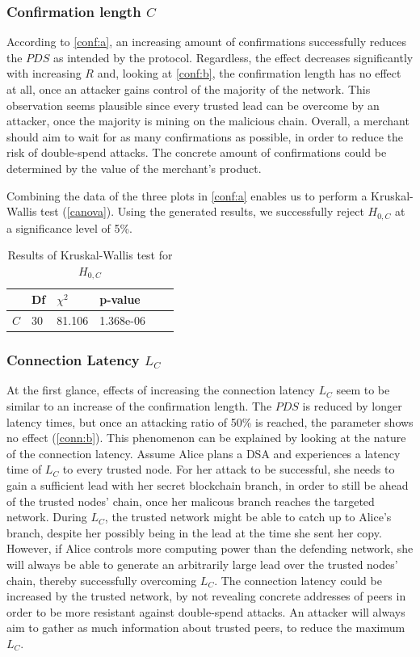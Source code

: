 \documentclass[a4paper,12pt,twoside]{report}
\begin{document}
\subsubsection{Confirmation length $C$} \label{consdisc}
According to \autoref{conf:a}, an increasing amount of confirmations successfully reduces the $PDS$ as intended by the protocol. Regardless, the effect decreases significantly with increasing $R$ and, looking at \autoref{conf:b}, the confirmation length has no effect at all, once an attacker gains control of the majority of the network. This observation seems plausible since every trusted lead can be overcome by an attacker, once the majority is mining on the malicious chain. Overall, a merchant should aim to wait for as many confirmations as possible, in order to reduce the risk of double-spend attacks. The concrete amount of confirmations could be determined by the value of the merchant's product.

Combining the data of the three plots in \autoref{conf:a} enables us to perform a Kruskal-Wallis test (\autoref{canova}). Using the generated results, we successfully reject $H_{0,C}$ at a significance level of 5\%.
\begin{table}[hb]
\centering
\begin{tabular}{|l|l|l|l|l|l|} \hline
& Df & $\chi^{2}$ & p-value \\ \hline
$C$ & 30 & 81.106 & 1.368e-06 \\ \hline
\end{tabular}
\caption{Results of Kruskal-Wallis test for $H_{0,C}$}
\label{canova}
\end{table}
\subsubsection{Connection Latency $L_C$} \label{connlatsec}
At the first glance, effects of increasing the connection latency $L_C$ seem to be similar to an increase of the confirmation length. The $PDS$ is reduced by longer latency times, but once an attacking ratio of 50\% is reached, the parameter shows no effect (\autoref{conn:b}). This phenomenon can be explained by looking at the nature of the connection latency. Assume Alice plans a DSA and experiences a latency time of $L_C$ to every trusted node. For her attack to be successful, she needs to gain a sufficient lead with her secret blockchain branch, in order to still be ahead of the trusted nodes' chain, once her malicous branch reaches the targeted network. During $L_C$, the trusted network might be able to catch up to Alice's branch, despite her possibly being in the lead at the time she sent her copy. However, if Alice controls more computing power than the defending network, she will always be able to generate an arbitrarily large lead over the trusted nodes' chain, thereby successfully overcoming $L_C$. The connection latency could be increased by the trusted network, by not revealing concrete addresses of peers in order to be more resistant against double-spend attacks. An attacker will always aim to gather as much information about trusted peers, to reduce the maximum $L_C$.
\end{document}
